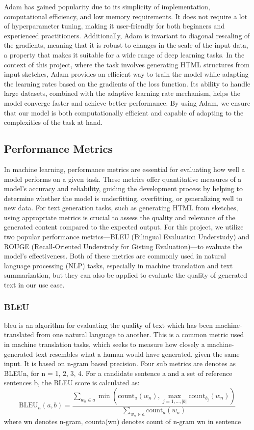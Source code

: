 Adam has gained popularity due to its simplicity of implementation, computational efficiency, and low memory requirements. It does not require a lot of hyperparameter tuning, making it user-friendly for both beginners and experienced practitioners. Additionally, Adam is invariant to diagonal rescaling of the gradients, meaning that it is robust to changes in the scale of the input data, a property that makes it suitable for a wide range of deep learning tasks.
In the context of this project, where the task involves generating HTML structures from input sketches, Adam provides an efficient way to train the model while adapting the learning rates based on the gradients of the loss function. Its ability to handle large datasets, combined with the adaptive learning rate mechanism, helps the model converge faster and achieve better performance. By using Adam, we ensure that our model is both computationally efficient and capable of adapting to the complexities of the task at hand.


\subsection{Performance Metrics}
In machine learning, performance metrics are essential for evaluating how well a model performs on a given task. These metrics offer quantitative measures of a model's accuracy and reliability, guiding the development process by helping to determine whether the model is underfitting, overfitting, or generalizing well to new data. For text generation tasks, such as generating HTML from sketches, using appropriate metrics is crucial to assess the quality and relevance of the generated content compared to the expected output.
For this project, we utilize two popular performance metrics—BLEU (Bilingual Evaluation Understudy) and ROUGE (Recall-Oriented Understudy for Gisting Evaluation)—to evaluate the model's effectiveness. Both of these metrics are commonly used in natural language processing (NLP) tasks, especially in machine translation and text summarization, but they can also be applied to evaluate the quality of generated text in our use case.
\subsubsection{BLEU}
\gls{bleu} is an algorithm for evaluating the quality of
text which has been machine-translated from one natural language to another. This is
a common metric used in machine translation tasks, which seeks to measure how
closely a machine-generated text resembles what a human would have generated, given
the same input. It is based on n-gram based precision. Four sub metrics are denotes as
BLEUn, for n = 1, 2, 3, 4. For a candidate sentence a and a set of reference sentences
b, the BLEU score is calculated as:
\begin{equation}
\text{BLEU}_n(a, b) = \frac{\sum_{w_n \in a} \min\left(\text{count}_a(w_n), \max_{j=1, \ldots, |b|} \text{count}_{b_j}(w_n)\right)}{\sum_{w_n \in a} \text{count}_a(w_n)}
\end{equation}
where wn denotes n-gram, counta(wn) denotes count of n-gram wn in sentence
